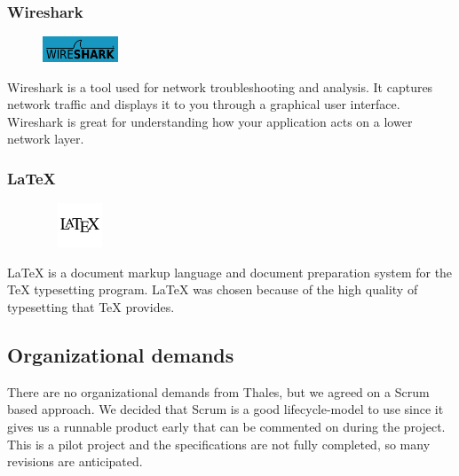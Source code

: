 \subsubsection{Wireshark}
\begin{figure}
  \vspace{0pt}
  \begin{center}
  \vspace{-20pt}
    \includegraphics[width=0.2\textwidth]{Wireshark}
  \end{center}

\end{figure}
Wireshark is a tool used for network troubleshooting and analysis. It captures network traffic and displays it to you through a graphical user interface. Wireshark is great for understanding how your application acts on a lower network layer.

\subsubsection{LaTeX}
\begin{figure}
  \vspace{-35pt}
  \begin{center}
    \includegraphics[width=0.2\textwidth, height=50px]{Latex}
  \end{center}

\end{figure}
LaTeX is a document markup language and document preparation system for the TeX typesetting program. LaTeX was chosen because of the high quality of typesetting that TeX provides.

\subsection{Organizational demands}
There are no organizational demands from Thales, but we agreed on a Scrum based approach. We decided that Scrum is a good lifecycle-model to use since it gives us a runnable product early that can be commented on during the project. This is a pilot project and the specifications are not fully completed, so many revisions are anticipated.

